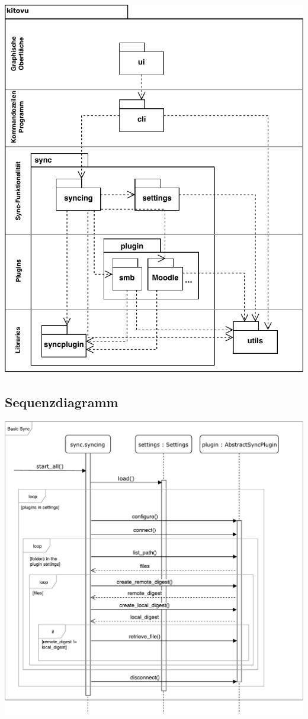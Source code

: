 \documentclass[a4paper]{article}
\begin{document}

\includegraphics[width=40em]{./img/schichtendiagramm.pdf}

\subsection{Sequenzdiagramm}

\includegraphics[width=40em]{./img/GrobesSequenzDiagramm.pdf}
\end{document}
